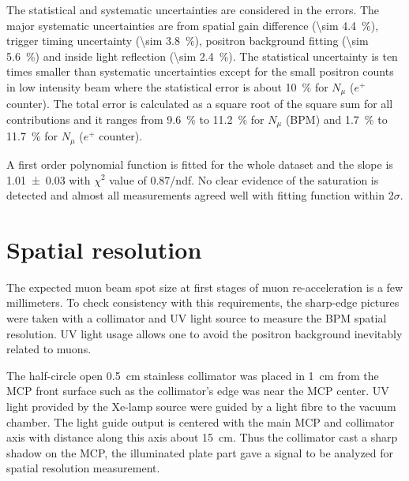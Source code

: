 \documentclass[preprint,3p,twocolumn]{elsarticle}
\begin{document}
The statistical and systematic uncertainties are considered in the errors. The major systematic uncertainties are from spatial gain difference (\SI{\sim 4.4}{\percent}), trigger timing uncertainty (\SI{\sim 3.8}{\percent}),
positron background fitting (\SI{\sim 5.6}{\percent}) and inside light reflection (\SI{\sim 2.4}{\percent}).
The statistical uncertainty is ten times smaller than systematic uncertainties except for the small positron counts in low intensity beam where the statistical error is about \SI{10}{\percent} for $N_\mu$ ($e^+$ counter).
The total error is calculated as a square root of the square sum for all contributions and it ranges from \SI{9.6}{\percent} to \SI{11.2}{\percent} for $N_\mu$ (BPM) and \SI{1.7}{\percent} to \SI{11.7}{\percent} for $N_\mu$ ($e^+$ counter).

A first order polynomial function is fitted for the whole dataset and the slope is \num{1.01 \pm 0.03} with $\chi^{2}$ value of 0.87/ndf. No clear evidence of the saturation is detected and almost all measurements agreed well with fitting function within 2$\sigma$.  

\section{Spatial resolution}
 
The expected muon beam spot size at first stages of muon re-acceleration is a few millimeters.
To check consistency with this requirements, the sharp-edge pictures were taken with a collimator and UV light source to measure the BPM spatial resolution.
UV light usage allows one to avoid the positron background inevitably related to muons.

The half-circle open \SI{.5}{\cm} stainless collimator was placed in \SI{1}{\cm} from the MCP front surface
such as the collimator's edge was near the MCP center.
UV light provided by the Xe-lamp source were guided by a light fibre to the vacuum chamber.
The light guide output is centered with the main MCP and collimator axis
with distance along this axis about \SI{15}{\cm}.
Thus the collimator cast a sharp shadow on the MCP,
the illuminated plate part gave a signal to be analyzed for spatial resolution measurement.
\end{document}
